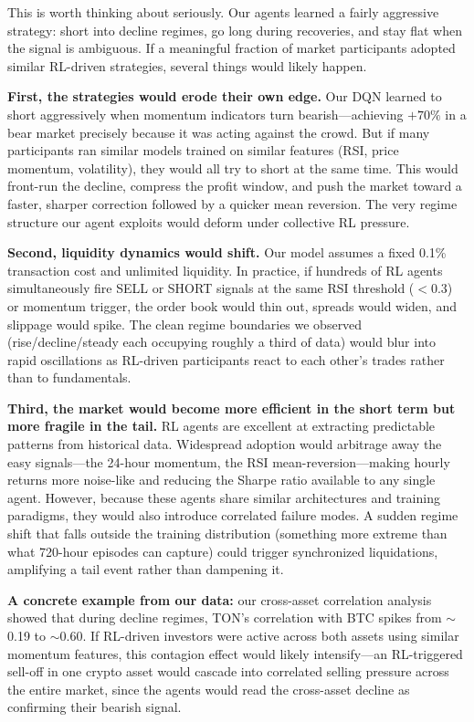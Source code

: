 \documentclass[11pt,a4paper]{article}
\begin{document}
This is worth thinking about seriously. Our agents learned a fairly aggressive strategy: short into decline regimes, go long during recoveries, and stay flat when the signal is ambiguous. If a meaningful fraction of market participants adopted similar RL-driven strategies, several things would likely happen.

\textbf{First, the strategies would erode their own edge.} Our DQN learned to short aggressively when momentum indicators turn bearish---achieving $+70\%$ in a bear market precisely because it was acting against the crowd. But if many participants ran similar models trained on similar features (RSI, price momentum, volatility), they would all try to short at the same time. This would front-run the decline, compress the profit window, and push the market toward a faster, sharper correction followed by a quicker mean reversion. The very regime structure our agent exploits would deform under collective RL pressure.

\textbf{Second, liquidity dynamics would shift.} Our model assumes a fixed 0.1\% transaction cost and unlimited liquidity. In practice, if hundreds of RL agents simultaneously fire SELL or SHORT signals at the same RSI threshold ($<0.3$) or momentum trigger, the order book would thin out, spreads would widen, and slippage would spike. The clean regime boundaries we observed (rise/decline/steady each occupying roughly a third of data) would blur into rapid oscillations as RL-driven participants react to each other's trades rather than to fundamentals.

\textbf{Third, the market would become more efficient in the short term but more fragile in the tail.} RL agents are excellent at extracting predictable patterns from historical data. Widespread adoption would arbitrage away the easy signals---the 24-hour momentum, the RSI mean-reversion---making hourly returns more noise-like and reducing the Sharpe ratio available to any single agent. However, because these agents share similar architectures and training paradigms, they would also introduce correlated failure modes. A sudden regime shift that falls outside the training distribution (something more extreme than what 720-hour episodes can capture) could trigger synchronized liquidations, amplifying a tail event rather than dampening it.

\textbf{A concrete example from our data:} our cross-asset correlation analysis showed that during decline regimes, TON's correlation with BTC spikes from $\sim$0.19 to $\sim$0.60. If RL-driven investors were active across both assets using similar momentum features, this contagion effect would likely intensify---an RL-triggered sell-off in one crypto asset would cascade into correlated selling pressure across the entire market, since the agents would read the cross-asset decline as confirming their bearish signal.
\end{document}

